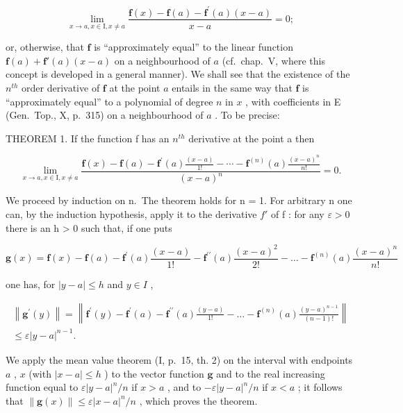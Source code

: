 \[
\lim _ {x \to a, x \in \mathrm{I}, x \neq a} \frac {\mathbf {f} (x) - \mathbf {f} (a) - \mathbf {f} ^ {\prime} (a) (x - a)}{x - a} = 0;\tag{6}
\]

or, otherwise, that \(\mathbf{f}\) is ``approximately equal'' to the linear function \(\mathbf{f}(a) + \mathbf{f}'(a)(x - a)\) on a neighbourhood of \(a\) (cf.~chap.~V, where this concept is developed in a general manner). We shall see that the existence of the \(n^{th}\) order derivative of \(\mathbf{f}\) at the point \(a\) entails in the same way that \(\mathbf{f}\) is ``approximately equal'' to a polynomial of degree \(n\) in \(x\) , with coefficients in E (Gen.~Top., X, p.~315) on a neighbourhood of \(a\) . To be precise:

THEOREM 1. If the function f has an \(n^{th}\) derivative at the point a then

\[
\lim _ {x \to a, x \in \mathrm{I}, x \neq a} \frac {\mathbf {f} (x) - \mathbf {f} (a) - \mathbf {f} ^ {\prime} (a) \frac {(x - a)}{1 !} - \cdots - \mathbf {f} ^ {(n)} (a) \frac {(x - a) ^ {n}}{n !}}{(x - a) ^ {n}} = 0.\tag{7}
\]

We proceed by induction on n.~The theorem holds for n = 1. For arbitrary n one can, by the induction hypothesis, apply it to the derivative \(f'\) of f : for any \(\varepsilon > 0\) there is an h \textgreater{} 0 such that, if one puts

\[
\mathbf {g} (x) = \mathbf {f} (x) - \mathbf {f} (a) - \mathbf {f} ^ {\prime} (a) \frac {(x - a)}{1 !} - \mathbf {f} ^ {\prime \prime} (a) \frac {(x - a) ^ {2}}{2 !} - \dots - \mathbf {f} ^ {(n)} (a) \frac {(x - a) ^ {n}}{n !}
\]

one has, for \(|y - a| \leqslant h\) and \(y \in I\) ,

\[
\begin{array}{l} \left\| \mathbf {g} ^ {\prime} (y) \right\| = \left\| \mathbf {f} ^ {\prime} (y) - \mathbf {f} ^ {\prime} (a) - \mathbf {f} ^ {\prime \prime} (a) \frac {(y - a)}{1 !} - \dots - \mathbf {f} ^ {(n)} (a) \frac {(y - a) ^ {n - 1}}{(n - 1) !} \right\| \\ \leqslant \varepsilon | y - a | ^ {n - 1}. \end{array}
\]

We apply the mean value theorem (I, p.~15, th. 2) on the interval with endpoints \(a\) , \(x\) (with \(|x - a| \leqslant h\) ) to the vector function \(\mathbf{g}\) and to the real increasing function equal to \(\varepsilon |y - a|^n / n\) if \(x > a\) , and to \(-\varepsilon |y - a|^n / n\) if \(x < a\) ; it follows that \(\| \mathbf{g}(x) \| \leqslant \varepsilon |x - a|^n / n\) , which proves the theorem.

